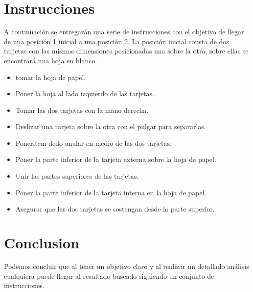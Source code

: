 \documentclass{article}
\begin{document}
\section{Instrucciones} \label{contenido}
A continuación se entregarán una serie de instrucciones con el objetivo de llegar de una posición 1 inicial a una posición 2. La posición inicial consta de dos tarjetas con las mismas dimensiones posicionadas una sobre la otra, sobre ellas se encontrará una hoja en blanco.
\begin{itemize}
    \item tomar la hoja de papel.
    \item Poner la hoja al lado izquierdo de las tarjetas.
    \item Tomar las dos tarjetas con la mano derecha.
    \item Deslizar una tarjeta sobre la otra con el pulgar para separarlas.
    \item Poneritem dedo anular en medio de las dos tarjetas.
    \item Poner la parte inferior de la tarjeta externa sobre la hoja de papel.
    \item Unir las partes superiores de las tarjetas.
    \item Poner la parte inferior de la tarjeta interna en la hoja de papel.
    \item Asegurar que las dos tarjetas se sostengan desde la parte superior.
\end{itemize}


\section{Conclusion}
Podemos concluir que al tener un objetivo claro y al realizar un detallado análisis cualquiera puede llegar al resultado buscado siguiendo un conjunto de instrucciones.




\end{document}
